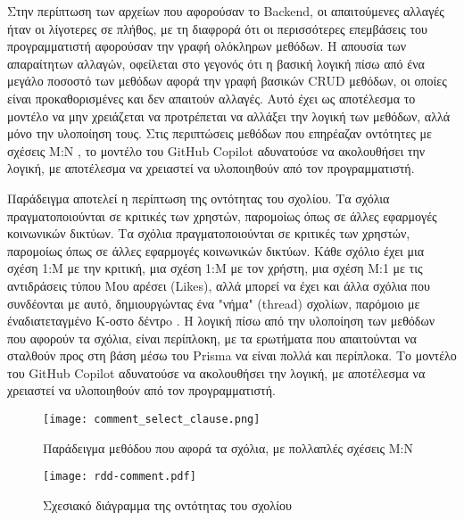   Στην περίπτωση των αρχείων που αφορούσαν το \textlatin{Backend}, οι
  απαιτούμενες αλλαγές ήταν οι λίγοτερες σε πλήθος, με τη διαφρορά ότι οι
  περισσότερες επεμβάσεις του προγραμματιστή αφορούσαν την γραφή ολόκληρων
  μεθόδων. Η απουσία των απαραίτητων αλλαγών, οφείλεται στο γεγονός ότι η
  βασική λογική πίσω από ένα μεγάλο ποσοστό των μεθόδων αφορά την γραφή
  βασικών \textlatin{CRUD} μεθόδων, οι οποίες είναι προκαθορισμένες και
  δεν απαιτούν αλλαγές. Αυτό έχει ως αποτέλεσμα το μοντέλο να μην
  χρειάζεται να προτρέπεται να αλλάξει την λογική των μεθόδων, αλλά μόνο
  την υλοποίηση τους. Στις περιπτώσεις μεθόδων που επηρέαζαν οντότητες με
  σχέσεις Μ:Ν \cite{prisma2022manytomany}, το μοντέλο του
  \textlatin{GitHub Copilot} αδυνατούσε να ακολουθήσει την λογική, με
  αποτέλεσμα να χρειαστεί να υλοποιηθούν από τον προγραμματιστή.

  Παράδειγμα αποτελεί η περίπτωση της οντότητας του σχολίου. Τα σχόλια
  πραγματοποιούνται σε κριτικές των χρηστών, παρομοίως όπως σε άλλες
  εφαρμογές κοινωνικών δικτύων. Τα σχόλια πραγματοποιούνται σε κριτικές
  των χρηστών, παρομοίως όπως σε άλλες εφαρμογές κοινωνικών δικτύων. Κάθε
  σχόλιο έχει μια σχέση 1:Μ με την κριτική, μια σχέση 1:Μ με τον χρήστη,
  μια σχέση Μ:1 με τις αντιδράσεις τύπου Μου αρέσει \textlatin{(Likes)},
  αλλά μπορεί να έχει και άλλα σχόλια που συνδέονται με αυτό,
  δημιουργώντας ένα "νήμα" \textlatin{(thread)} σχολίων, παρόμοιο
  με έναδιατεταγμένο Κ-οστο δέντρo \cite{gabillon2002access}. Η λογική
  πίσω από την υλοποίηση των μεθόδων που αφορούν τα σχόλια, είναι
  περίπλοκη, με τα ερωτήματα που απαιτούνται να σταλθούν προς στη βάση
  μέσω του \textlatin{Prisma} να είναι πολλά και περίπλοκα. Το μοντέλο του
  \textlatin{GitHub Copilot} αδυνατούσε να ακολουθήσει την λογική, με
  αποτέλεσμα να χρειαστεί να υλοποιηθούν από τον προγραμματιστή.

  \begin{figure}[H]
    \centering
    \texttt{[image: comment\_select\_clause.png]}
    \caption{Παράδειγμα μεθόδου που αφορά τα σχόλια, με πολλαπλές
    σχέσεις Μ:Ν}
    \label{fig:commentSelectClause}
  \end{figure}

  \begin{figure}[H]
    \begin{center}
      \texttt{[image: rdd-comment.pdf]}
      \caption{Σχεσιακό διάγραμμα της οντότητας του σχολίου}
    \end{center}
    \label{fig:commentRdd}
  \end{figure}

